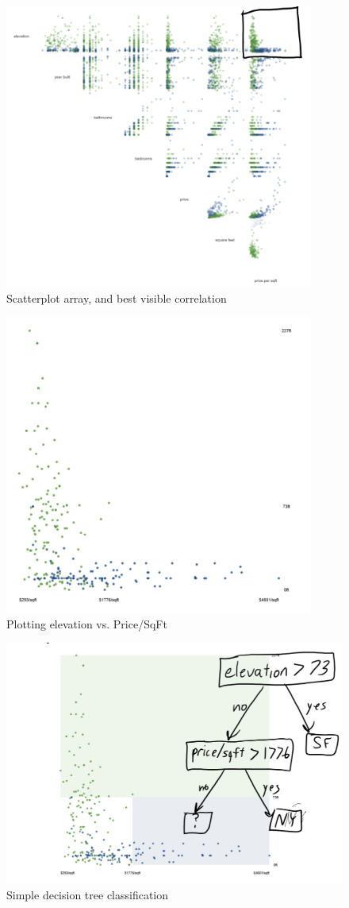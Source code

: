 \documentclass{article}
\theoremstyle{definition}
\begin{document}
\begin{figure}[H]
	\centering
	\includegraphics[width = 4in]{Pic2}
	\caption{Scatterplot array, and best visible correlation}
	
	
\end{figure}
\begin{figure}[H]
	\centering
	\includegraphics[width = 4in]{Pic3}
	\caption{Plotting elevation vs. Price/SqFt}
\end{figure}
\begin{figure}[H]
	\centering
	\includegraphics[width = 5in]{Pic4}
	\caption{Simple decision tree classification}
\end{figure}
\end{document}
